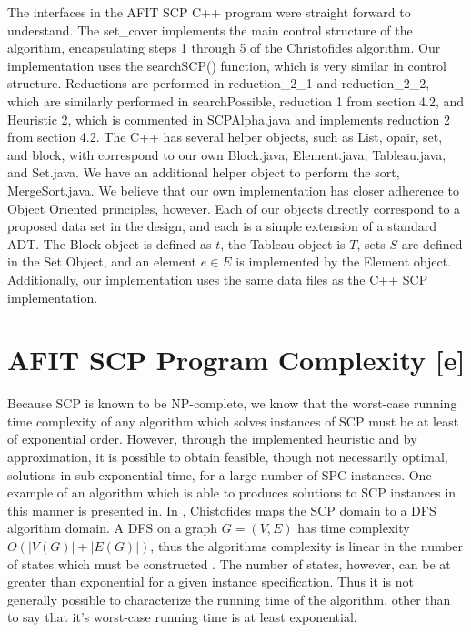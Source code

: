 \documentclass[12pt]{article}
\begin{document}
	The interfaces in the AFIT SCP C++ program were straight forward to understand. The set\_cover implements the main control structure of the algorithm, encapsulating steps 1 through 5 of the Christofides algorithm. Our implementation uses the searchSCP() function, which is very similar in control structure. Reductions are performed in reduction\_2\_1 and reduction\_2\_2, which are similarly performed in searchPossible, reduction 1 from section 4.2, and Heuristic 2, which is commented in SCPAlpha.java and implements reduction 2 from section 4.2. The C++ has several helper objects, such as List, opair, set, and block, with correspond to our own Block.java, Element.java, Tableau.java, and Set.java. We have an additional helper object to perform the sort, MergeSort.java. We believe that our own implementation has closer adherence to Object Oriented principles, however. Each of our objects directly correspond to a proposed data set in the design, and each is a simple extension of a standard ADT. The Block object is defined as $t$, the Tableau object is $T$, sets $S$ are defined in the Set Object, and an element $e \in E$ is implemented by the Element object. Additionally, our implementation uses the same data files as the C++ SCP implementation.
	
	
	\section{AFIT SCP Program Complexity [e]} \label{scn:complexity}
	
	Because SCP is known to be NP-complete, we know that the worst-case running time complexity of any algorithm which solves instances of SCP must be at least of exponential order. However, through the implemented heuristic and by approximation, it is possible to obtain feasible, though not necessarily optimal, solutions in sub-exponential time, for a large number of SPC instances. One example of an algorithm which is able to produces solutions to SCP instances in this manner is presented in\cite{graph_algorithms_cristofides}. In \cite{graph_algorithms_cristofides}, Chistofides maps the SCP domain to a DFS algorithm domain. A DFS on a graph $G=(V,E)$ has time complexity $O(|V(G)|+|E(G)|)$, thus the algorithms complexity is linear in the number of states which must be constructed \cite{AlgorithmsBook}. The number of states, however, can be at greater than exponential for a given instance specification. Thus it is not generally possible to characterize the running time of the algorithm, other than to say that it's worst-case running time is at least exponential.
	
\end{document}
